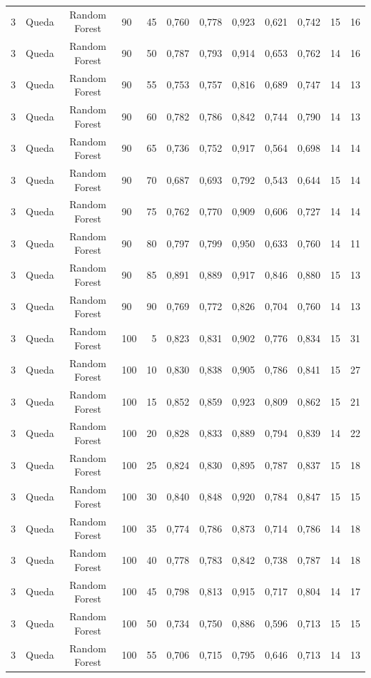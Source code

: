 \begin{longtable}{ccclrrrrrrrr}
3 & Queda & Random Forest & 90 & 45 & 0,760 & 0,778 & 0,923 & 0,621 & 0,742 & 15 & 16 \\
3 & Queda & Random Forest & 90 & 50 & 0,787 & 0,793 & 0,914 & 0,653 & 0,762 & 14 & 16 \\
3 & Queda & Random Forest & 90 & 55 & 0,753 & 0,757 & 0,816 & 0,689 & 0,747 & 14 & 13 \\
3 & Queda & Random Forest & 90 & 60 & 0,782 & 0,786 & 0,842 & 0,744 & 0,790 & 14 & 13 \\
3 & Queda & Random Forest & 90 & 65 & 0,736 & 0,752 & 0,917 & 0,564 & 0,698 & 14 & 14 \\
3 & Queda & Random Forest & 90 & 70 & 0,687 & 0,693 & 0,792 & 0,543 & 0,644 & 15 & 14 \\
3 & Queda & Random Forest & 90 & 75 & 0,762 & 0,770 & 0,909 & 0,606 & 0,727 & 14 & 14 \\
3 & Queda & Random Forest & 90 & 80 & 0,797 & 0,799 & 0,950 & 0,633 & 0,760 & 14 & 11 \\
3 & Queda & Random Forest & 90 & 85 & 0,891 & 0,889 & 0,917 & 0,846 & 0,880 & 15 & 13 \\
3 & Queda & Random Forest & 90 & 90 & 0,769 & 0,772 & 0,826 & 0,704 & 0,760 & 14 & 13 \\
3 & Queda & Random Forest & 100 & 5 & 0,823 & 0,831 & 0,902 & 0,776 & 0,834 & 15 & 31 \\
3 & Queda & Random Forest & 100 & 10 & 0,830 & 0,838 & 0,905 & 0,786 & 0,841 & 15 & 27 \\
3 & Queda & Random Forest & 100 & 15 & 0,852 & 0,859 & 0,923 & 0,809 & 0,862 & 15 & 21 \\
3 & Queda & Random Forest & 100 & 20 & 0,828 & 0,833 & 0,889 & 0,794 & 0,839 & 14 & 22 \\
3 & Queda & Random Forest & 100 & 25 & 0,824 & 0,830 & 0,895 & 0,787 & 0,837 & 15 & 18 \\
3 & Queda & Random Forest & 100 & 30 & 0,840 & 0,848 & 0,920 & 0,784 & 0,847 & 15 & 15 \\
3 & Queda & Random Forest & 100 & 35 & 0,774 & 0,786 & 0,873 & 0,714 & 0,786 & 14 & 18 \\
3 & Queda & Random Forest & 100 & 40 & 0,778 & 0,783 & 0,842 & 0,738 & 0,787 & 14 & 18 \\
3 & Queda & Random Forest & 100 & 45 & 0,798 & 0,813 & 0,915 & 0,717 & 0,804 & 14 & 17 \\
3 & Queda & Random Forest & 100 & 50 & 0,734 & 0,750 & 0,886 & 0,596 & 0,713 & 15 & 15 \\
3 & Queda & Random Forest & 100 & 55 & 0,706 & 0,715 & 0,795 & 0,646 & 0,713 & 14 & 13 \\

\end{longtable}
